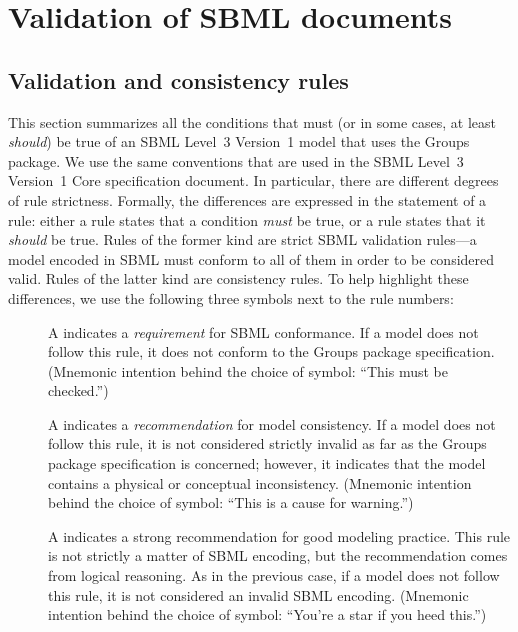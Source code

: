 
\section{Validation of SBML documents}
\label{apdx-validation}

\subsection{Validation and consistency rules}
\label{validation-rules}

This section summarizes all the conditions that must (or in some cases, at least \emph{should}) be true of an SBML Level~3 Version~1 model that uses the Groups package.  We use the same conventions that are used in the SBML Level~3 Version~1 Core specification document.  In particular, there are different degrees of rule strictness.  Formally, the differences are expressed in the statement of a rule: either a rule states that a condition \emph{must} be true, or a rule states that it \emph{should} be true.  Rules of the former kind are strict SBML validation rules---a model encoded in SBML must conform to all of them in order to be considered valid.  Rules of the latter kind are consistency rules.  To help highlight these differences, we use the following three symbols next to the rule numbers:

\begin{description}

\item[\hspace*{6.5pt}\vSymbol\vsp] A \vSymbolName indicates a \emph{requirement} for SBML conformance. If a model does not follow this rule, it does not conform to the Groups package specification.  (Mnemonic intention behind the choice of symbol: ``This must be checked.'')

\item[\hspace*{6.5pt}\cSymbol\csp] A \cSymbolName indicates a \emph{recommendation} for model consistency.  If a model does not follow this rule, it is not considered strictly invalid as far as the Groups package specification is concerned; however, it indicates that the model contains a physical or conceptual inconsistency.  (Mnemonic intention behind the choice of symbol: ``This is a cause for warning.'')

\item[\hspace*{6.5pt}\mSymbol\msp] A \mSymbolName indicates a strong recommendation for good modeling practice.  This rule is not strictly a matter of SBML encoding, but the recommendation comes from logical reasoning.  As in the previous case, if a model does not follow this rule, it is not considered an invalid SBML encoding.  (Mnemonic intention behind the choice of symbol: ``You're a star if you heed this.'')

\end{description}


